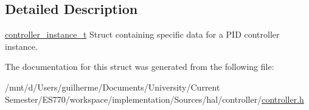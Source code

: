 \subsection{Detailed Description}
\hyperlink{structcontroller__instance__t}{controller\-\_\-instance\-\_\-t} Struct containing specific data for a P\-I\-D controller instance. 

The documentation for this struct was generated from the following file\-:\begin{DoxyCompactItemize}
\item 
/mnt/d/\-Users/guilherme/\-Documents/\-University/\-Current Semester/\-E\-S770/workspace/implementation/\-Sources/hal/controller/\hyperlink{controller_8h}{controller.\-h}\end{DoxyCompactItemize}
